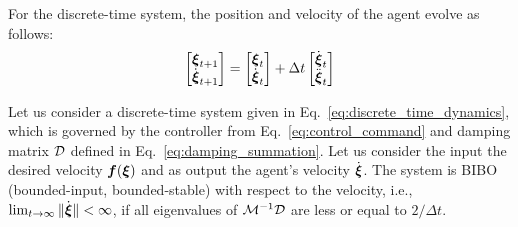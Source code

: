 For the discrete-time system, the position and velocity of the agent evolve as follows:
\begin{equation}
	\begin{bmatrix}
	 \vecs \xi_{t+1} \\ \dot{\vecs \xi}_{t+1}
	\end{bmatrix}
	=
	\begin{bmatrix}
	 \vecs \xi_{t} \\ \dot{\vecs \xi}_{t}
	\end{bmatrix}
	+ 
	\Delta t 
	\begin{bmatrix}
		\dot{\vecs \xi}_{t} \\ \ddot{\vecs \xi}_t 
	\end{bmatrix}
	\label{eq:discrete_time_dynamics}
\end{equation}

\begin{lemma}
	Let us consider a discrete-time system given in Eq.~\eqref{eq:discrete_time_dynamics}, which is governed by the controller from Eq.~\eqref{eq:control_command} and damping matrix $\mathcal{D}$ defined in Eq.~\eqref{eq:damping_summation}.
	Let us consider the input the desired velocity $\boldsymbol{f}(\boldsymbol{\xi})$ and as output the agent's velocity $\dot{\boldsymbol{\xi}}$. 
	The system is BIBO (bounded-input, bounded-stable) with respect to the velocity, i.e., $\lim_{t \rightarrow \infty} \| \dot{\boldsymbol{\xi}} \| < \infty$, if all eigenvalues of $\mathcal{M}^{-1} \mathcal{D}$ are less or equal to $2 / \Delta t$.
\end{lemma}


